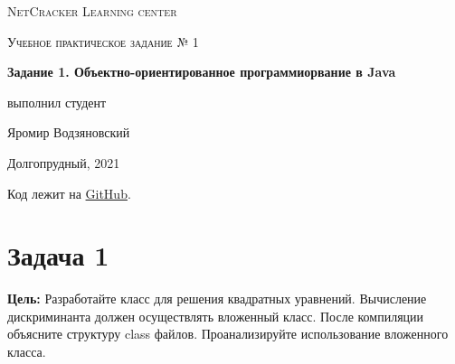 \documentclass[a4paper]{article}
\begin{document}
\graphicspath{ {pictures/} }

\begin{titlepage}
	\centering
	\vspace{5cm}
    {\scshape\LARGE NetCracker Learning center\par}
	\vspace{5cm}
	{\scshape\Large  Учебное практическое задание № 1 \par}
	\vspace{1cm}
    {\huge\bfseries  Задание 1. Объектно-ориентированное программиорвание в Java \par}
	\vspace{1cm}
	\vfill
    \begin{flushright}
        {\large выполнил студент}\par
        \vspace{0.3cm}
        {\LARGE Яромир Водзяновский}
    \end{flushright}
	\vfill
Долгопрудный, 2021
\end{titlepage}

\pagestyle{fancy} 
\fancyfoot[C]{ \noindent\rule{\textwidth}{0.4pt} \thepage }



\newpage 


Код лежит на \href{https://github.com/yarvod/NetCracker_LearningCenter/tree/main/Practise_tasks/Practice_task_1}{GitHub}.

\section{Задача 1}

\textbf{Цель:} Разработайте класс для решения квадратных уравнений. Вычисление дискриминанта должен осуществлять вложенный класс. После компиляции объясните структуру class файлов. Проанализируйте использование вложенного класса. \par
\end{document}
